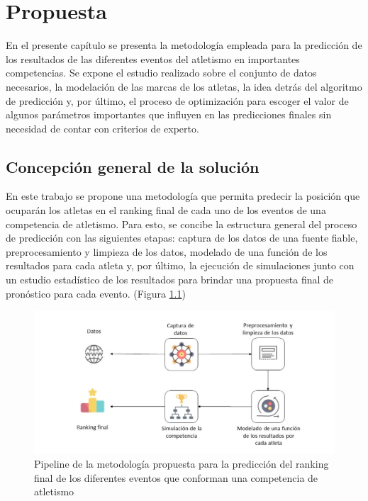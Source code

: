 \chapter{Propuesta}\label{chapter:proposal}

En el presente capítulo se presenta la metodología empleada para la predicción de los resultados de las diferentes eventos del atletismo en importantes competencias. Se expone el estudio realizado sobre el conjunto de datos necesarios, la modelación de las marcas de los atletas, la idea detrás del algoritmo de predicción y, por último, el proceso de optimización para escoger el valor de algunos parámetros importantes que influyen en las predicciones finales sin necesidad de contar con criterios de experto. 

\section{Concepción general de la solución}

En este trabajo se propone una metodología que permita predecir la posición que ocuparán los atletas en el ranking final de cada uno de los eventos de una competencia de atletismo. Para esto, se concibe la estructura general del proceso de predicción con las siguientes etapas: captura de los datos de una fuente fiable, preprocesamiento y limpieza de los datos, modelado de una función de los resultados para cada atleta y, por último, la ejecución de simulaciones junto con un estudio estadístico de los resultados para brindar una propuesta final de pronóstico para cada evento. (Figura \ref{fig:diagram1})

\begin{figure}[H]
    \includegraphics[width=\linewidth]{Graphics/diagram1.jpg}
    \caption{Pipeline de la metodología propuesta para la predicción del ranking final de los diferentes eventos que conforman una competencia de atletismo}
    \label{fig:diagram1}
\end{figure}

